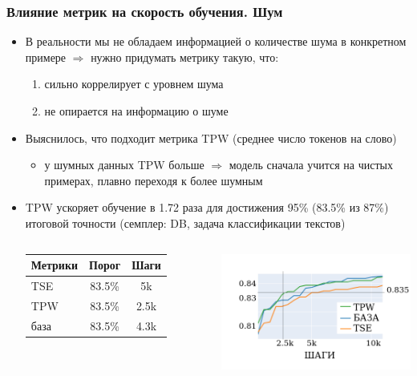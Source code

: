 \documentclass{beamer}
\begin{document}
\begin{frame}
	\frametitle{Влияние метрик на скорость обучения. Шум}
	\begin{itemize}
		\item В реальности мы не обладаем информацией о количестве шума в конкретном примере $\Rightarrow$ нужно придумать метрику такую, что:
		\begin{enumerate}
			\item сильно коррелирует с уровнем шума
			\item не опирается на информацию о шуме
		\end{enumerate}
		\item Выяснилось, что подходит метрика TPW (среднее число токенов на слово)
			\begin{itemize}
				\item у шумных данных TPW больше $\Rightarrow$ модель сначала учится на чистых примерах, плавно переходя к более шумным
			\end{itemize}
		\item TPW ускоряет обучение в 1.72 раза для достижения 95\% (83.5\% из 87\%) итоговой точности (семплер: DB, задача классификации текстов)
			
		\vspace{-10pt}
			
		\begin{columns}
				\begin{table}
					\begin{tabular}{lcc}
						\hline
						Метрики & Порог & Шаги \\
						\hline
						TSE & 83.5\% & 5k\\
						TPW & 83.5\% & 2.5k\\
						\hline
						база & 83.5\% & 4.3k\\
						\hline
					\end{tabular}
				\end{table}			
				\centering
				\includegraphics[scale=0.45]{keyboard_noise_TPW_win}		
		\end{columns}
	\end{itemize}
\end{frame}
\end{document}
